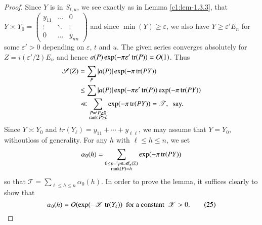 \begin{proof}
Since $Y$ is in $S_{t,u}$, we see exactly as in Lemma \ref{c1:lem-1.3.3},
that $Y\asymp Y_{0} = \left(\begin{smallmatrix} y_{11} &\ldots & 0\\
\vdots &\ddots & \vdots\\ 0 & \ldots & y_{nn}
\end{smallmatrix}\right)$ and since $\min(Y)\geq \varepsilon$, we also
have $Y\geq \varepsilon'E_{n}$ for some $\varepsilon'>0$ depending on
$\varepsilon$, $t$ and $u$. The given series converges absolutely for
$Z=i(\varepsilon'/2)E_{n}$ and hence $a(P)\exp(-\pi
\varepsilon'\operatorname{tr}(P))=O(1)$. Thus
\begin{align*}
\mathscr{S} (Z) &= \sum\limits_{P}|a(P)|\exp (-\pi \operatorname{tr} (PY))\\
&\leq \sum|a(P)|\exp(-\pi\varepsilon'\operatorname{tr}(P))\exp(-\pi \operatorname{tr}(PY))\\
&\ll \sum_{\substack{P={}^{t}P\geq 0\\ \operatorname{rank} P\geq
    \ell}}\exp(-\pi\operatorname{tr}(PY))=\mathscr{T},\text{ \ say.} 
\end{align*}
Since $Y\asymp Y_{0}$ and $tr(Y_{\ell})=y_{11}+\cdots+y_{\ell\ell}$,
we may assume that $Y=Y_{0}$, without\pageoriginale loss of
generality. For any $h$ with $\ell\leq h\leq n$, we set
$$
\alpha_{0}(h)=\sum\limits_{\substack{0\leq p={}^{t}p\in
  \mathscr{M}_{n}(\mathbb{Z})\\ \operatorname{rank} (P)=h}}\exp(-\pi \operatorname{tr}(PY))
$$
so that $\mathscr{T}=\sum\limits_{\ell\leq h\leq n}\alpha_{0}(h)$. In
order to prove the lemma, it suffices clearly to show that
\begin{equation*}
\alpha_{0}(h)=O(\exp(-\mathscr{X}\operatorname{tr}(Y_{\ell}))\text{ \ for a constant
  \ }\mathscr{X}>0.\tag{25}\label{c1:eq25}
\end{equation*}
\end{proof}

